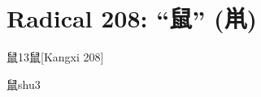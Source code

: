 
\section*{Radical 208: ``⿏'' (鼡)}

\begin{entry}{鼠}{13}{⿏}[Kangxi 208]
  \begin{phonetics}{鼠}{shu3}
  \end{phonetics}
\end{entry}


